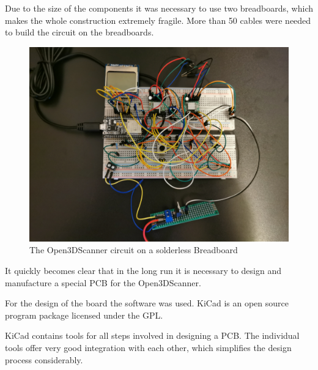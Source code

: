 Due to the size of the components it was necessary to use two breadboards, which makes the whole construction extremely fragile. More than 50 cables were needed to build the circuit on the breadboards.%

\begin{figure}[ht!]%
	\begin{centered}%
		\includegraphics[width=\linewidth]{images/Breadboard.jpg}%
		\caption{The Open3DScanner circuit on a solderless Breadboard}%
		\label{f:breadboard}%
	\end{centered}%
\end{figure}%

It quickly becomes clear that in the long run it is necessary to design and manufacture a special PCB for the Open3DScanner.%

For the design of the board the software  was used.  KiCad is an open source program package licensed under the GPL.%

KiCad contains tools for all steps involved in designing a PCB. The individual tools offer very good integration with each other, which simplifies the design process considerably.%

